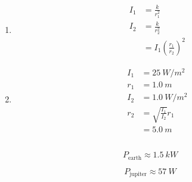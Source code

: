 \documentclass{article}
\begin{document}
\subsection{}

\begin{enumerate}
  \item

        \begin{align*}
          I_1 & = \frac{k}{r_1^2}                      \\
          I_2 & = \frac{k}{r_2^2}                      \\
              & = I_1 \left( \frac{r_1}{r_2} \right)^2
        \end{align*}

  \item

        \begin{align*}
          I_1 & = \qty{25}{W/m^2}            \\
          r_1 & = \qty{1.0}{m}               \\
          I_2 & = \qty{1.0}{W/m^2}           \\
          r_2 & = \sqrt{\frac{I_1}{I_2}} r_1 \\
              & = \qty{5.0}{m}
        \end{align*}
\end{enumerate}

\subsection{}

\[P_\text{earth} \approx \qty{1.5}{kW}\]

\[P_\text{jupiter} \approx \qty{57}{W}\]

\subsection{}
\end{document}
